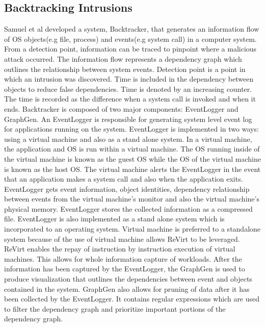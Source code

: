 \subsection{Backtracking Intrusions}
Samuel et al \cite{King:2003:BI:945445.945467} developed a system, Backtracker, that generates an information flow of OS objects(e.g file, process) and events(e.g system call) in a computer system. From a detection point, information can be traced to pinpoint where a malicious attack occurred. The information flow represents a dependency graph which outlines the relationship between system events. Detection point is a point in which an intrusion was discovered. Time is included in the dependency between objects to reduce false dependencies. Time is denoted by an increasing counter. The time is recorded as the difference when a system call is invoked and when it ends. Backtracker is composed of two major components: EventLogger and GraphGen. An EventLogger is responsible for generating system level event log for applications running on the system. EventLogger is implemented in two ways: using a virtual machine and also as a stand alone system. In a virtual machine, the application and OS is run within a virtual machine. The OS running inside of the virtual machine is known as the guest OS while the OS of the virtual machine is known as the host OS. The virtual machine alerts the EventLogger in the event that an application makes a system call and also when the application exits. EventLogger gets event information, object identities, dependency relationship between events from the virtual machine's monitor and also the virtual machine's physical memory. EventLogger stores the collected information as a compressed file. EventLogger is also implemented as a stand alone system which is incorporated to an operating system. Virtual machine is preferred to a standalone system because of the use of virtual machine allows ReVirt to be leveraged. ReVirt enables the repay of instruction by instruction execution of virtual machines. This allows for whole information capture of workloads. After the information has been captured by the EventLogger, the GraphGen is used to produce visualization that outlines the dependencies between event and objects contained in the system. GraphGen also allows for pruning of data after it has been collected by the EventLogger. It contains regular expressions which are used to filter the dependency graph and prioritize important portions of the dependency graph.



